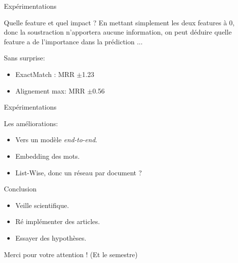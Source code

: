\documentclass{beamer}
\begin{document}
\begin{frame}{Expérimentations}
    \begin{block}{Quelle feature et quel impact ?}
        En mettant simplement les deux features à 0, donc la soustraction n'apportera aucune information, on peut déduire quelle feature a de l'importance dans la prédiction ...\newline
        
        Sans surprise:
        
        \begin{itemize}
            \item ExactMatch : MRR $\pm$1.23
            \item Alignement max: MRR $\pm$0.56
        \end{itemize}
        
    \end{block}
\end{frame}

\begin{frame}{Expérimentations}
    \begin{block}{Les améliorations:}
        
        \begin{itemize}
            \item Vers un modèle \textit{end-to-end}.
            \item Embedding des mots.
            \item List-Wise, donc un réseau par document ?
        \end{itemize}
        
    \end{block}
\end{frame}
    

\begin{frame}{Conclusion}
    
    \begin{itemize}
        \item Veille scientifique.
        \item Ré implémenter des articles.
        \item Essayer des hypothèses.
    \end{itemize}
\end{frame}

\begin{frame}{}
    \centering
    {\Huge Merci pour votre attention ! \newline\newline\newline (Et le semestre)}
\end{frame}
\end{document}
